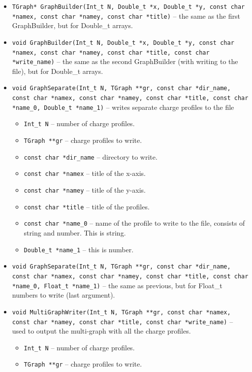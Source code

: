 \documentclass[12pt,oneside,notitlepage,abstracton,a4paper]{scrartcl}
\begin{document}
\begin{itemize}
\begin{itemize}
\end{itemize}
\item \lstinline$TGraph* GraphBuilder(Int_t N, Double_t *x, Double_t *y, const char *namex, const char *namey, const char *title)$ -- the same as the first GraphBuilder, but for Double\_t arrays.
\item \lstinline$void GraphBuilder(Int_t N, Double_t *x, Double_t *y, const char *namex, const char *namey, const char *title, const char *write_name)$ -- the same as the second GraphBuilder (with writing to the file), but for Double\_t arrays.
\item \lstinline$void GraphSeparate(Int_t N, TGraph **gr, const char *dir_name, const char *namex, const char *namey, const char *title, const char *name_0, Double_t *name_1)$ -- writes separate charge profiles to the file
\begin{itemize}
\item \lstinline$Int_t N$ --  number of charge profiles.
\item \lstinline$TGraph **gr$ -- charge profiles to write.
\item \lstinline$const char *dir_name$ -- directory to write.
\item \lstinline$const char *namex$ -- title of the x-axis.
\item \lstinline$const char *namey$ -- title of the y-axis.
\item \lstinline$const char *title$ -- title of the profiles.
\item \lstinline$const char *name_0$ -- name of the profile to write to the file, consists of string and number. This is string.
\item \lstinline$Double_t *name_1$ -- this is number.
\end{itemize}
\item \lstinline$void GraphSeparate(Int_t N, TGraph **gr, const char *dir_name, const char *namex, const char *namey, const char *title, const char *name_0, Float_t *name_1)$ -- the same as previous, but for Float\_t numbers to write (last argument).
\item \lstinline$void MultiGraphWriter(Int_t N, TGraph **gr, const char *namex, const char *namey, const char *title, const char *write_name)$ -- used to output the multi-graph with all the charge profiles.
\begin{itemize}
\item \lstinline$Int_t N$ --  number of charge profiles.
\item \lstinline$TGraph **gr$ -- charge profiles to write.

\end{itemize}
\end{itemize}
\end{document}
